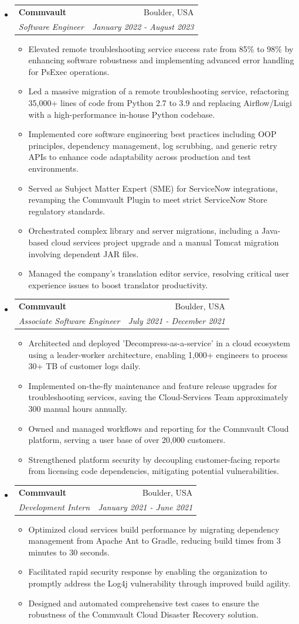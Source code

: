 \documentclass[letterpaper,11pt]{article}
\makeatletter
\newcommand{\resitem}[1]{\item #1 \vspace{-2pt}}
\newcommand{\ressubheading}[4]{
    \begin{tabular*}{6.5in}{p{4.8in}@{\extracolsep{\fill}}r}
            \textbf{#1} & #2 \\
            \textit{#3} & \textit{#4} \\
    \end{tabular*}\vspace{-8pt}}
\makeatother
\begin{document}
      \begin{itemize}
        \item \ressubheading{Commvault}{Boulder, USA}{Software Engineer}{January 2022 - August 2023}
        \begin{itemize}
            \resitem{Elevated remote troubleshooting service success rate from 85\% to 98\% by enhancing software robustness and implementing advanced error handling for PsExec operations.}
            \resitem{Led a massive migration of a remote troubleshooting service, refactoring 35,000+ lines of code from Python 2.7 to 3.9 and replacing Airflow/Luigi with a high-performance in-house Python codebase.}
            \resitem{Implemented core software engineering best practices including OOP principles, dependency management, log scrubbing, and generic retry APIs to enhance code adaptability across production and test environments.}
            \resitem{Served as Subject Matter Expert (SME) for ServiceNow integrations, revamping the Commvault Plugin to meet strict ServiceNow Store regulatory standards.}
            \resitem{Orchestrated complex library and server migrations, including a Java-based cloud services project upgrade and a manual Tomcat migration involving dependent JAR files.}
            \resitem{Managed the company's translation editor service, resolving critical user experience issues to boost translator productivity.}
        \end{itemize}
        \item \ressubheading{Commvault}{Boulder, USA}{Associate Software Engineer}{July 2021 - December 2021}
        \begin{itemize}
            \resitem{Architected and deployed 'Decompress-as-a-service' in a cloud ecosystem using a leader-worker architecture, enabling 1,000+ engineers to process 30+ TB of customer logs daily.}
            \resitem{Implemented on-the-fly maintenance and feature release upgrades for troubleshooting services, saving the Cloud-Services Team approximately 300 manual hours annually.}
            \resitem{Owned and managed workflows and reporting for the Commvault Cloud platform, serving a user base of over 20,000 customers.}
            \resitem{Strengthened platform security by decoupling customer-facing reports from licensing code dependencies, mitigating potential vulnerabilities.}
        \end{itemize}
        \item \ressubheading{Commvault}{Boulder, USA}{Development Intern}{January 2021 - June 2021}
        \begin{itemize}
            \resitem{Optimized cloud services build performance by migrating dependency management from Apache Ant to Gradle, reducing build times from 3 minutes to 30 seconds.}
            \resitem{Facilitated rapid security response by enabling the organization to promptly address the Log4j vulnerability through improved build agility.}
            \resitem{Designed and automated comprehensive test cases to ensure the robustness of the Commvault Cloud Disaster Recovery solution.}
        \end{itemize}
      \end{itemize}
\end{document}
